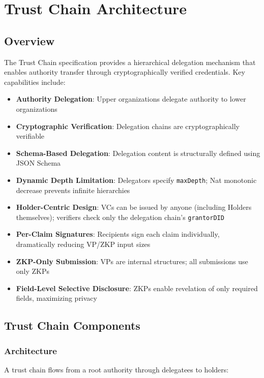 \chapter{Trust Chain Architecture}

\section{Overview}

The Trust Chain specification provides a hierarchical delegation mechanism that enables authority transfer through cryptographically verified credentials. Key capabilities include:

\begin{itemize}
  \item \textbf{Authority Delegation}: Upper organizations delegate authority to lower organizations
  \item \textbf{Cryptographic Verification}: Delegation chains are cryptographically verifiable
  \item \textbf{Schema-Based Delegation}: Delegation content is structurally defined using JSON Schema
  \item \textbf{Dynamic Depth Limitation}: Delegators specify \texttt{maxDepth}; Nat monotonic decrease prevents infinite hierarchies
  \item \textbf{Holder-Centric Design}: VCs can be issued by anyone (including Holders themselves); verifiers check only the delegation chain's \texttt{grantorDID}
  \item \textbf{Per-Claim Signatures}: Recipients sign each claim individually, dramatically reducing VP/ZKP input sizes
  \item \textbf{ZKP-Only Submission}: VPs are internal structures; all submissions use only ZKPs
  \item \textbf{Field-Level Selective Disclosure}: ZKPs enable revelation of only required fields, maximizing privacy
\end{itemize}

\section{Trust Chain Components}

\subsection{Architecture}

A trust chain flows from a root authority through delegatees to holders:


